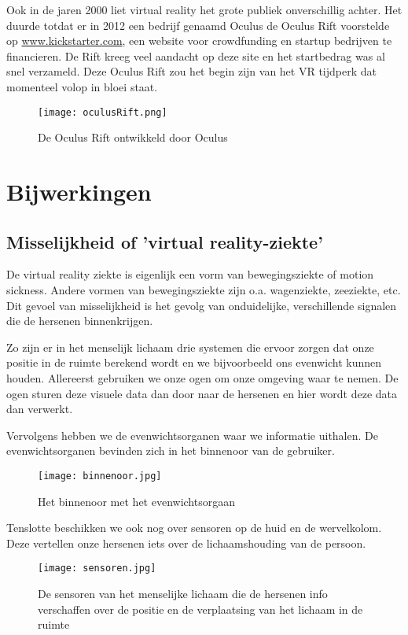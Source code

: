 Ook in de jaren 2000 liet virtual reality het grote publiek onverschillig achter. Het duurde totdat er in 2012 een bedrijf genaamd Oculus de Oculus Rift voorstelde op \href{https://www.kickstarter.com/}{www.kickstarter.com}, een website voor crowdfunding en startup bedrijven te financieren. De Rift kreeg veel aandacht op deze site en het startbedrag was al snel verzameld. Deze Oculus Rift zou het begin zijn van het VR tijdperk dat momenteel volop in bloei staat.

\begin{figure}[h]
    \centering
    \texttt{[image: oculusRift.png]}
    \caption{De Oculus Rift ontwikkeld door Oculus}
\end{figure}

\section{Bijwerkingen}
\subsection{Misselijkheid of 'virtual reality-ziekte'}

De virtual reality ziekte is eigenlijk een vorm van bewegingsziekte of motion sickness. Andere vormen van bewegingsziekte zijn o.a. wagenziekte, zeeziekte, etc. Dit gevoel van misselijkheid is het gevolg van onduidelijke, verschillende signalen die de hersenen binnenkrijgen.

Zo zijn er in het menselijk lichaam drie systemen die ervoor zorgen dat onze positie in de ruimte berekend wordt en we bijvoorbeeld ons evenwicht kunnen houden.
Allereerst gebruiken we onze ogen om onze omgeving waar te nemen. De ogen sturen deze visuele data dan door naar de hersenen en hier wordt deze data dan verwerkt.

Vervolgens hebben we de evenwichtsorganen waar we informatie uithalen. De evenwichtsorganen bevinden zich in het binnenoor van de gebruiker.

\begin{figure}[h]
    \centering
    \texttt{[image: binnenoor.jpg]}
    \caption{Het binnenoor met het evenwichtsorgaan}
\end{figure}

Tenslotte beschikken we ook nog over sensoren op de huid en de wervelkolom. Deze vertellen onze hersenen iets over de lichaamshouding van de persoon.

\begin{figure}[h]
    \centering
    \texttt{[image: sensoren.jpg]}
    \caption{De sensoren van het menselijke lichaam die de hersenen info verschaffen over de positie en de verplaatsing van het lichaam in de ruimte}
\end{figure}

